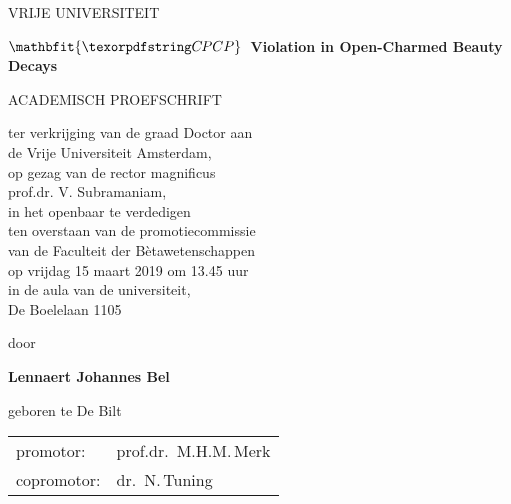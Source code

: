 \thispagestyle{empty}
\begin{center}

VRIJE UNIVERSITEIT

\vspace{.0666666667\paperheight}

{\Large \textbf{\(\mathbfit{\CP}\)~Violation in Open-Charmed Beauty Decays}}

\vspace{.1333333333\paperheight}

ACADEMISCH PROEFSCHRIFT

\vspace{\baselineskip}

ter verkrijging van de graad Doctor aan\\
de Vrije Universiteit Amsterdam,\\
op gezag van de rector magnificus\\
prof.dr. V. Subramaniam,\\
in het openbaar te verdedigen\\
ten overstaan van de promotiecommissie\\
van de Faculteit der Bètawetenschappen\\
op vrijdag 15 maart 2019 om 13.45 uur\\
in de aula van de universiteit,\\
De Boelelaan 1105

\vspace{.15\paperheight}

door

\vspace{\baselineskip}

\textbf{Lennaert Johannes Bel}

\vspace{\baselineskip}

geboren te De Bilt

\end{center}

\clearpage
\thispagestyle{empty}

\begin{tabular}{ll}
    promotor: & prof.dr.~M.H.M.\,Merk \tabularnewline
    copromotor: & dr.~N.\,Tuning
\end{tabular}
